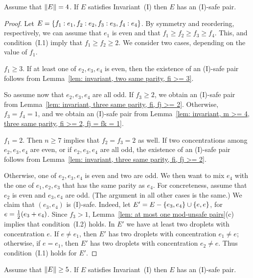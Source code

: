 \begin{lemma}%
	\label{lem: m = 4, preserves invariant}
	Assume that ${\|E\|}=4$.
	If $E$ satisfies Invariant~(I) then $E$ has an (I)-safe pair.
\end{lemma}%

\begin{proof}
	Let $E = { \left\{ f_1:e_1, f_2:e_2, f_3:e_3, f_4:e_4 \right\} }$.
	By symmetry and reordering, respectively, we can assume that $e_1$ is even and that
	$f_1\ge f_2\ge f_3\ge f_4$. This, and condition~(I.1) imply that $f_1\geq f_2\geq 2$.
	We consider two cases, depending on the value of $f_1$.
	
	\smallskip\noindent
	 $f_1\ge 3$.
	If at least one of $e_2,e_3,e_4$ is even, then the existence of an
	(I)-safe pair follows from Lemma~\ref{lem: invariant, two same parity, fi >= 3}.
	
	So assume now that $e_2,e_3,e_4$ are all odd.
	If $f_3\ge 2$, we obtain an (I)-safe pair from
	Lemma~\ref{lem: invariant, three same parity, fi, fj >= 2}.
	Otherwise, $f_3 = f_4 = 1$, and we obtain an (I)-safe pair
	from Lemma~\ref{lem: invariant, m >= 4, three same parity, fi >= 2, fj = fk = 1}.
	
	\smallskip\noindent
	 $f_1 = 2$. Then $n\ge 7$ implies that $f_2 = f_3 = 2$ as well.
	If two concentrations among $e_2,e_3,e_4$ are even,
	or if $e_2,e_3,e_4$ are all odd,
	the existence of an (I)-safe pair follows from
	Lemma~\ref{lem: invariant, three same parity, fi, fj >= 2}.
	
	Otherwise, one of $e_2,e_3,e_4$ is even and two are odd.
	We then want to mix $e_4$ with the one of $e_1,e_2,e_3$ that has the same parity as $e_4$.
	For concreteness, assume that $e_2$ is even and $e_3,e_4$ are odd.
	(The argument in all other cases is the same.)
	We claim that $(e_3,e_4)$ is (I)-safe. 
	Indeed, let $E'= E-{ \left\{ e_3,e_4 \right\} }\cup { \left\{ e,e \right\} }$,
	for $e = {\textstyle\frac{1}{2}} (e_3+e_4)$.
	Since $f_3>1$, Lemma~\ref{lem: at most one mod-unsafe pairs}(c)
	implies that condition~(I.2) holds.
	In $E'$ we have at least two droplets with concentration $e$.
	If $e\neq e_1$, then $E'$ has
	two droplets with concentration $e_1\neq e$;
	otherwise, if $e = e_1$, then $E'$ has
	two droplets with concentration $e_2\neq e$.
	Thus condition~(I.1) holds for $E'$.
\end{proof}


\begin{lemma}%
	\label{lem: m => 5, preserves invariant}
	Assume that ${\|E\|}\ge 5$.
	If $E$ satisfies Invariant~(I) then $E$ has an (I)-safe pair.
\end{lemma}%

